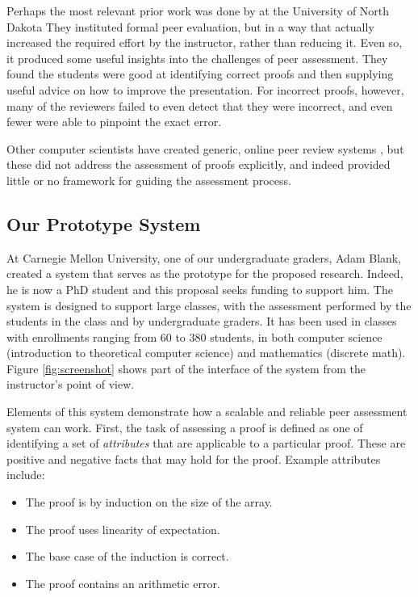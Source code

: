\documentclass[12pt]{article}
\begin{document}
Perhaps the most relevant prior work was done by \citet{zerr-primus11} at the
University of North Dakota
They instituted formal peer evaluation, but
in a way that actually increased the required effort by the
instructor, rather than reducing it.  Even so, it produced some
useful insights into the challenges of peer assessment.  They found
the students were good at identifying correct proofs and then
supplying useful advice on how to improve the presentation.  For
incorrect proofs, however, many of the reviewers failed to even detect
that they were incorrect, and even fewer were able to pinpoint the exact error.

Other computer scientists have created generic, online peer review systems
\citep{gehringer-sigcse05, wolfe-ite04}, but these did not address the
assessment of proofs explicitly, and indeed provided little or no
framework for guiding the assessment process.

\subsection{Our Prototype System}

At Carnegie Mellon University, one of our undergraduate graders, Adam
Blank, created a system that serves as the prototype for the proposed
research.  Indeed, he is now a PhD student and this proposal seeks
funding to support him.  The system is designed to support large classes,
with the assessment performed by the students in the class and by
undergraduate graders.  It has been used in classes with enrollments
ranging from 60 to 380 students, in both computer science (introduction
to theoretical computer science) and mathematics (discrete math). 
Figure \ref{fig:screenshot} shows part of the interface of the system 
from the instructor's point of view.

Elements of this system demonstrate 
how a scalable and reliable peer assessment system can work.  First,
the task of assessing a proof is defined as one of identifying a set of
{\em attributes} that are applicable to a particular proof.  These are
positive and negative facts that may hold for the proof.  Example
attributes include:
\begin{itemize}
\item The proof is by induction on the size of the array.
\item The proof uses linearity of expectation.
\item The base case of the induction is correct.
\item The proof contains an arithmetic error.
\end{itemize}
\end{document}
